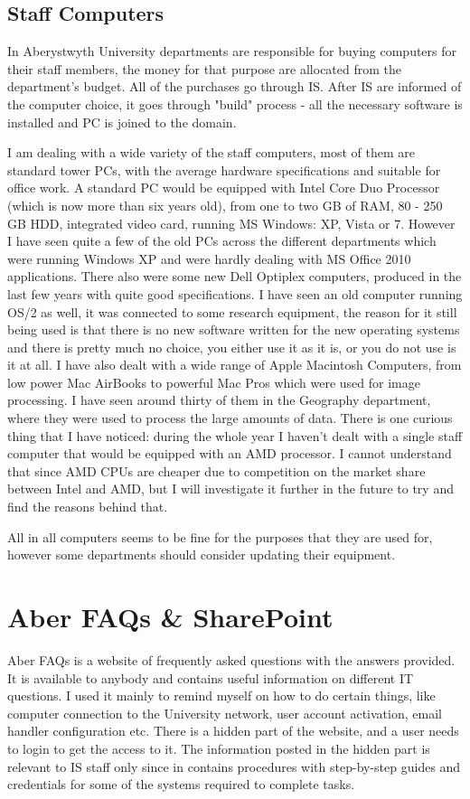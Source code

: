 \documentclass[10pt,a4paper,headinclude=true]{report}
\begin{document}
\subsection{Staff Computers}
In Aberystwyth University departments are responsible for buying computers for their staff members, the money for that purpose are allocated from the department's budget. All of the purchases go through IS. After IS are informed of the computer choice, it goes through "build" process - all the necessary software is installed and PC is joined to the domain. 

I am dealing with a wide variety of the staff computers, most of them are standard tower PCs, with the average hardware specifications and suitable for office work. A standard PC would be equipped with Intel Core Duo Processor (which is now more than six years old), from one to two GB of RAM, 80 - 250 GB HDD, integrated video card, running MS Windows: XP, Vista or 7. However I have seen quite a few of the old PCs across the different departments which were running Windows XP and were hardly dealing with MS Office 2010 applications. There also were some new Dell Optiplex computers, produced in the last few years with quite good specifications. I have seen an old computer running OS/2 as well, it was connected to some research equipment, the reason for it still being used is that there is no new software written for the new operating systems and there is pretty much no choice, you either use it as it is, or you do not use is it at all. I have also dealt with a wide range of Apple Macintosh Computers, from low power Mac AirBooks to powerful Mac Pros which were used for image processing. I have seen around thirty of them in the Geography department, where they were used to process the large amounts of data. There is one curious thing that I have noticed: during the whole year I haven't dealt with a single staff computer that would be equipped with an AMD processor. I cannot understand that since AMD CPUs are cheaper due to competition on the market share between Intel and AMD, but I will investigate it further in the future to try and find the reasons behind that.

All in all computers seems to be fine for the purposes that they are used for, however some departments should consider updating their equipment. 

\section{Aber FAQs \& SharePoint}
Aber FAQs is a website of frequently asked questions with the answers provided. It is available to anybody and contains useful information on different IT questions. I used it mainly to remind myself on how to do certain things, like computer connection to the University network, user account activation, email handler configuration etc. There is a hidden part of the website, and a user needs to login to get the access to it. The information posted in the hidden part is relevant to IS staff only since in contains procedures with step-by-step guides and credentials for some of the systems required to complete tasks.
\end{document}
